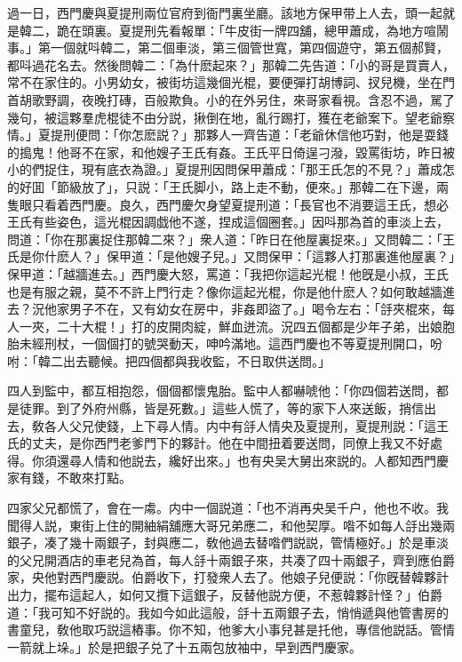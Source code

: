過一日，西門慶與夏提刑兩位官府到衙門裏坐廳。該地方保甲带上人去，頭一起就是韓二，跪在頭裏。夏提刑先看報單：「牛皮街一牌四舖，總甲蕭成，為地方喧鬧事。」第一個就呌韓二，第二個車淡，第三個管世寬，第四個遊守，第五個郝賢，都呌過花名去。然後問韓二：「為什麽起來？」那韓二先告道：「小的哥是買賣人，常不在家住的。小男幼女，被街坊這幾個光棍，要便彈打胡博詞、扠兒機，坐在門首胡歌野調，夜晚打磚，百般欺負。小的在外另住，來哥家看視。含忍不過，駡了幾句，被這夥羣虎棍徒不由分説，揪倒在地，亂行踢打，獲在老爺案下。望老爺察情。」夏提刑便問：「你怎麽説？」那夥人一齊告道：「老爺休信他巧對，他是耍錢的搗鬼！他哥不在家，和他嫂子王氏有姦。王氏平日倚逞刁潑，毀罵街坊，昨日被小的們捉住，現有底衣為證。」夏提刑因問保甲蕭成：「那王氏怎的不見？」蕭成怎的好囬「節級放了」，只説：「王氏脚小，路上走不動，便來。」那韓二在下邊，兩隻眼只看着西門慶。良久，西門慶欠身望夏提刑道：「長官也不消要這王氏，想必王氏有些姿色，這光棍因調戯他不遂，捏成這個圈套。」因呌那為首的車淡上去，問道：「你在那裏捉住那韓二來？」衆人道：「昨日在他屋裏捉來。」又問韓二：「王氏是你什麽人？」保甲道：「是他嫂子兒。」又問保甲：「這夥人打那裏進他屋裏？」保甲道：「越牆進去。」西門慶大怒，罵道：「我把你這起光棍！他旣是小叔，王氏也是有服之親，莫不不許上門行走？像你這起光棍，你是他什麽人？如何敢越牆進去？況他家男子不在，又有幼女在房中，非姦即盜了。」喝令左右：「㧱夾棍來，每人一夾，二十大棍！」打的皮開肉綻，鮮血迸流。況四五個都是少年子弟，出娘胞胎未經刑杖，一個個打的號哭動天，呻吟滿地。這西門慶也不等夏提刑開口，吩咐：「韓二出去聽候。把四個都與我收監，不日取供送問。」

四人到監中，都互相抱怨，個個都懷鬼胎。監中人都嚇唬他：「你四個若送問，都是徒罪。到了外府州縣，皆是死數。」這些人慌了，等的家下人來送飯，捎信出去，敎各人父兄使錢，上下尋人情。内中有㧱人情央及夏提刑，夏提刑説：「這王氏的丈夫，是你西門老爹門下的夥計。他在中間扭着要送問，同僚上我又不好處得。你須還尋人情和他説去，纔好出來。」也有央吴大舅出來説的。人都知西門慶家有錢，不敢來打點。

四家父兄都慌了，會在一䖏。内中一個説道：「也不消再央吴千户，他也不收。我聞得人説，東街上住的開紬絹舖應大哥兄弟應二，和他契厚。喒不如每人㧱出幾兩銀子，凑了幾十兩銀子，封與應二，敎他過去替喒們説説，管情極好。」於是車淡的父兄開酒店的車老兒為首，每人㧱十兩銀子來，共凑了四十兩銀子，齊到應伯爵家，央他對西門慶説。伯爵收下，打發衆人去了。他娘子兒便説：「你旣替韓夥計出力，擺布這起人，如何又攬下這銀子，反替他説方便，不惹韓夥計怪？」伯爵道：「我可知不好説的。我如今如此這般，㧱十五兩銀子去，悄悄遞與他管書房的書童兒，敎他取巧説這樁事。你不知，他爹大小事兒甚是托他，專信他説話。管情一箭就上垛。」於是把銀子兑了十五兩包放袖中，早到西門慶家。

